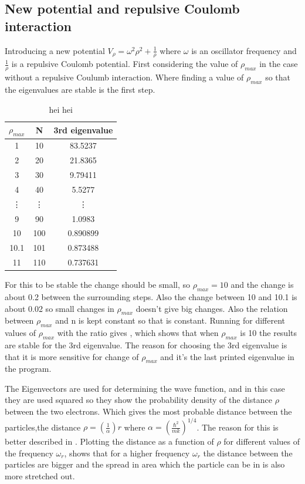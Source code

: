 
\subsection*{New potential and repulsive Coulomb interaction}


Introducing a new potential $V_{\rho} = \omega^2\rho^2 + \frac{1}{\rho}$ where $\omega$ is an oscillator frequency and $\frac{1}{\rho}$ is a repulsive Coulomb potential. First considering the value of $\rho_{max}$ in the case without a repulsive Coulumb interaction. Where finding a value of $\rho_{max}$ so that the eigenvalues are stable is the first step.   
\begin{table}
\caption{hei hei} 
\label{tab:rhomax}
\phantom{.}
\begin{tabular}{|c|c|c|}
\hline
$\rho_{max}$ & N & 3rd eigenvalue \\
\hline 
1 & 10 & 83.5237 \\
2 & 20 & 21.8365 \\
3 & 30 & 9.79411 \\
4 & 40 & 5.5277 \\
\vdots & \vdots & \vdots \\
9 & 90 & 1.0983 \\
10 & 100 & 0.890899 \\
10.1 & 101 & 0.873488 \\
11 & 110 & 0.737631 \\
\hline

\end{tabular}

\end{table}
For this to be stable the change should be small, so $\rho_{max} = 10$ and the change is about 0.2 between the surrounding steps. Also the change between 10 and 10.1 is about 0.02 so small changes in $\rho_{max} $ doesn't give big changes. Also the relation between $\rho_{max}$ and n is kept constant so that  is constant. Running for different values of $\rho_{max}$ with the ratio gives , which shows that when $\rho_{max} $ is 10 the results are stable for the 3rd eigenvalue. The reason for choosing the 3rd eigenvalue is that it is more sensitive for change of $\rho_{max}$ and it's the last printed eigenvalue in the program. 


The Eigenvectors are used for determining the wave function, and in this case they are used squared so they show the probability density of the distance $\rho$ between the two electrons. Which gives the most probable distance between the particles,the distance $\rho = (\frac{1}{\alpha})r$ where $\alpha = (\frac{\hbar^2}{mk})^{1/4}$. The reason for this is better described in . Plotting the distance as a function of $\rho$ for different values of the frequency $\omega_r$,  shows that for a higher frequency $\omega_r$ the distance between the particles are bigger and the spread in area which the particle can be in is also more stretched out. 


